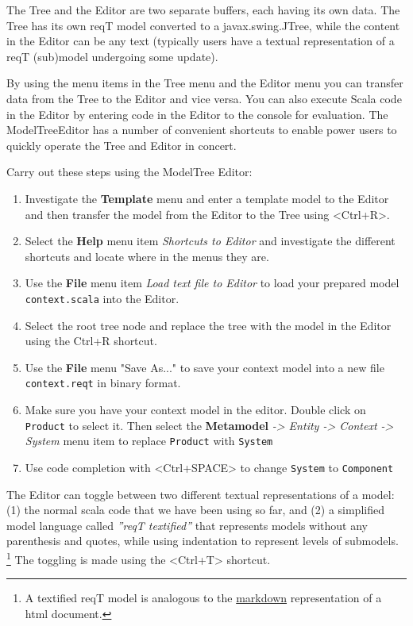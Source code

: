 \documentclass[11pt]{article}
\begin{document}
The Tree and the Editor are two separate buffers, each having its own data. The Tree has its own reqT model converted to a javax.swing.JTree, while the content in the Editor can be any text (typically users have a textual representation of a reqT (sub)model undergoing  some update). 

By using the menu items in the Tree menu and the Editor menu you can transfer data from the Tree to the Editor and vice versa. You can also execute Scala code in the Editor by entering code in the Editor to the console for evaluation. The ModelTreeEditor has a number of convenient shortcuts to enable power users to quickly operate the Tree and Editor in concert.

\begin{framed}
Carry out these steps using the ModelTree Editor:
\begin{enumerate}
\item Investigate the {\bf Template} menu and enter a template model to the Editor and then transfer the model from the Editor to the Tree using <Ctrl+R>.
\item Select the {\bf Help} menu item {\it Shortcuts to Editor} and investigate the different shortcuts and locate where in the menus they are. 
\item Use the {\bf File} menu item {\it Load text file to Editor} to load your prepared model \verb+context.scala+ into the Editor.
\item Select the root tree node and replace the tree with the model in the Editor using the Ctrl+R shortcut.
\item Use the {\bf File} menu "Save As..." to save your context model into a new file \verb+context.reqt+ in binary format.
\item Make sure you have your context model in the editor. Double click on \verb+Product+ to select it. Then select the {\bf Metamodel} {\it -> Entity -> Context -> System} menu item to replace \verb+Product+ with \verb+System+
\item Use code completion with <Ctrl+SPACE> to change \verb+System+ to \verb+Component+ 
\end{enumerate}
\end{framed}

The Editor can toggle between two different textual representations of a model: (1) the normal scala code that we have been using so far, and (2) a simplified model language called {\it ''reqT textified''} that represents models without any parenthesis and quotes, while using indentation to represent levels of submodels. \footnote{A textified reqT model is analogous to the \href{http://en.wikipedia.org/wiki/Markdown}{markdown} representation of a html document.} The toggling is made using the <Ctrl+T> shortcut.
\end{document}

